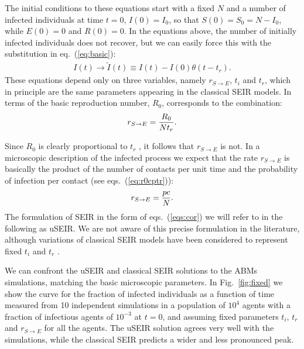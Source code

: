 \documentclass[a4paper,oneside,11pt]{article}
\begin{document}
The initial conditions to these equations start with a fixed $N$ and a number of infected individuals at time $t=0$, $I(0)= I_0$, so that $S(0)=S_0 = N-I_0$, while $E(0)=0$ and $R(0)=0$.
In the  equations above, the number of initially infected individuals does not recover, but we can easily force this with the substitution in eq.~(\ref{eq:basic}):
\begin{eqnarray}
I(t) \rightarrow \tilde{I}(t) \equiv I(t) - I(0) \theta(t-t_r).
\end{eqnarray}
These equations depend only on three variables, namely $r_{S\rightarrow E}$, $t_i$ and $t_r$, which in principle are the same parameters appearing in the classical SEIR models. In terms of the 
basic reproduction number, $R_0$,  corresponds to the combination:
\begin{eqnarray}
r_{S\rightarrow E} = {R_0\over N t_r}.
\end{eqnarray}

Since $R_0$ is clearly proportional to $t_r$ , it follows that $r_{S\rightarrow E}$ is not. In a microscopic description of the infected process we expect that the rate $r_{S\rightarrow E}$ is basically the product of the number of contacts per unit time and the probability of infection per contact (see eqs.~(\ref{eq:r0cptr})):
\begin{eqnarray}
r_{S\rightarrow E} = {p c \over N}.
\end{eqnarray}
The  formulation of SEIR in the form of eqs.~(\ref{eqs:cor}) we will refer to in the following as uSEIR. We are not aware of this precise formulation in the literature, although variations of classical SEIR models have been considered to represent fixed $t_i$ and $t_r$ \cite{}. 

  We can confront the uSEIR and classical SEIR solutions to the ABMs simulations, matching the basic microscopic parameters. 
In Fig.~\ref{fig:fixed} we show the curve for the fraction of infected individuals as a function of time measured from 10 independent simulations in a population of $10^4$ agents with a fraction of infectious agents of $10^{-3}$ at $t=0$, and assuming fixed parameters $t_i$, $t_r$ and $r_{S\rightarrow E}$ for all the agents.
The uSEIR solution agrees very well with the simulations, while the classical SEIR predicts a wider and less pronounced peak.
\end{document}
